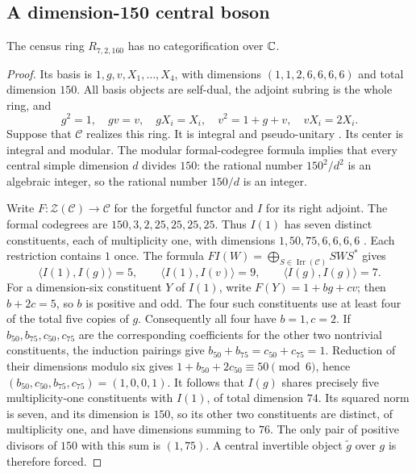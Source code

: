 \subsection{A dimension-150 central boson}
\label{sec:r160}

\begin{proposition}
The census ring $R_{7,2,160}$ has no categorification over $\mathbb C$.
\end{proposition}
\begin{proof}
Its basis is $1,g,v,X_1,\ldots,X_4$, with dimensions
$(1,1,2,6,6,6,6)$ and total dimension $150$. All basis objects are
self-dual, the adjoint subring is the whole ring, and
\[
g^2=1,\quad gv=v,\quad gX_i=X_i,\quad
v^2=1+g+v,\quad vX_i=2X_i.
\]
Suppose that $\mathcal C$ realizes this ring. It is integral and
pseudo-unitary \cite{ENO}. Its center is integral and modular. The
modular formal-codegree formula implies that every central simple
dimension $d$ divides $150$: the rational number $150^2/d^2$ is an
algebraic integer, so the rational number $150/d$ is an integer.

Write $F:\mathcal Z(\mathcal C)\to\mathcal C$ for the forgetful functor
and $I$ for its right adjoint. The formal codegrees are
$150,3,2,25,25,25,25$. Thus $I(1)$ has seven distinct constituents,
each of multiplicity one, with dimensions $1,50,75,6,6,6,6$
\cite[Theorem~2.13]{OstrikRank3}. Each restriction contains $1$ once.
The formula
$FI(W)=\bigoplus_{S\in\operatorname{Irr}(\mathcal C)}SWS^*$ gives
\[
\langle I(1),I(g)\rangle=5,\qquad
\langle I(1),I(v)\rangle=9,\qquad
\langle I(g),I(g)\rangle=7.
\]
For a dimension-six constituent $Y$ of $I(1)$, write
$F(Y)=1+b g+c v$; then $b+2c=5$, so $b$ is positive and odd.
The four such constituents use at least four of the total five copies
of $g$. Consequently all four have $b=1,c=2$.
If $b_{50},b_{75},c_{50},c_{75}$ are the corresponding coefficients
for the other two nontrivial constituents, the induction pairings give
$b_{50}+b_{75}=c_{50}+c_{75}=1$. Reduction of their dimensions modulo
six gives $1+b_{50}+2c_{50}\equiv50\pmod6$, hence
$(b_{50},c_{50},b_{75},c_{75})=(1,0,0,1)$.
It follows that $I(g)$ shares precisely five multiplicity-one
constituents with $I(1)$, of total dimension $74$.
Its squared norm is seven, and its dimension is $150$, so its other
two constituents are distinct, of multiplicity one, and have dimensions
summing to $76$. The only pair of positive divisors of $150$ with this
sum is $(1,75)$. A central invertible object $\widetilde g$ over $g$
is therefore forced.


\end{proof}
